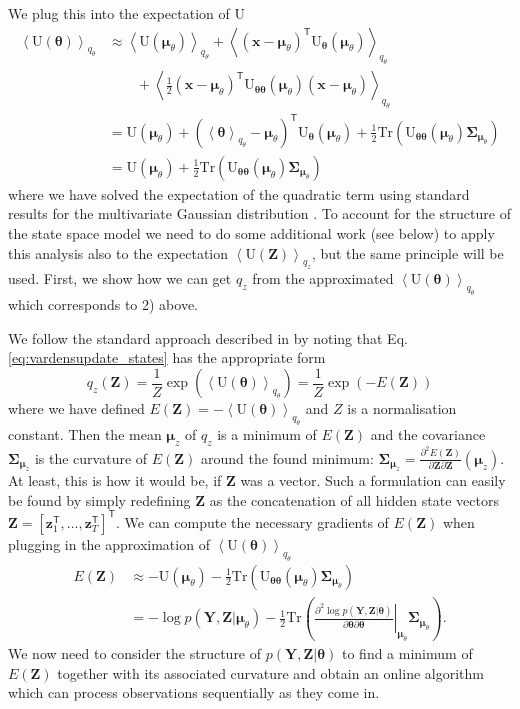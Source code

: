 \documentclass[a4paper,10pt]{article}
\newcommand{\bs}[1]{\mathbf{#1}}					%
\newcommand{\bgs}[1]{\boldsymbol{#1}}				%
\newcommand{\ppd}[3]{\frac{\partial^2 #1}{\partial #2 \partial #3}} %
\newcommand{\tr}{\mathsf{T}}				%
\newcommand{\eq}[1]{\begin{equation} #1 \end{equation}}%
\newcommand{\trace}[1]{\mathrm{Tr}\left(#1\right)}					%
\renewcommand{\ss}{z}         %
\newcommand{\sh}{x}         %
\newcommand{\spm}{\mu}    %
\renewcommand{\sp}{\theta}    %
\newcommand{\ps}{\bs{\ss}}    %
\newcommand{\ph}{\bs{\sh}}    %
\newcommand{\ppm}{\bgs{\spm}}   %
\newcommand{\pp}{\bgs{\sp}} %
\newcommand{\Ps}{\bs{Z}}    %
\newcommand{\Po}{\bs{Y}}    %
\newcommand{\E}[2][]{\left\langle #2 \right\rangle_{#1}}	%
\newcommand{\U}{\mathrm{U}}			%
\newcommand{\Cov}{\bgs{\Sigma}}			%
\begin{document}
We plug this into the expectation of $\U$
\begin{align}
    \E[q_\sp]{\U(\pp)} &\approx 
            \E[q_\sp]{\U(\ppm_\sp)} + \E[q_\sp]{(\ph - \ppm_\sp)^\tr \U_{\pp}(\ppm_\sp)}\nonumber\\
               & \qquad + \E[q_\sp]{\frac{1}{2}(\ph - \ppm_\sp)^\tr \U_{\pp\pp}(\ppm_\sp) (\ph - \ppm_\sp)}\\
        &= \U(\ppm_\sp) + \left(\E[q_\sp]{\pp} - \ppm_\sp\right)^\tr \U_{\pp}(\ppm_\sp) + \frac{1}{2}\trace{\U_{\pp\pp}(\ppm_\sp)\Cov_{\ppm_\sp}}\\
        &= \U(\ppm_\sp) + \frac{1}{2}\trace{\U_{\pp\pp}(\ppm_\sp)\Cov_{\ppm_\sp}}
\end{align}
where we have solved the expectation of the quadratic term using standard results for the multivariate Gaussian distribution \citep[][eq. (357)]{Petersen2008}. To account for the structure of the state space model we need to do some additional work (see below) to apply this analysis also to the expectation $\E[q_\ss]{\U(\Ps)}$, but the same principle will be used. First, we show how we can get $q_\ss$ from the approximated $\E[q_\sp]{\U(\pp)}$ which corresponds to 2) above.

We follow the standard approach described in \cite[p. 255]{Murphy2012} by noting that Eq. \ref{eq:vardensupdate_states} has the appropriate form
\eq{
    q_{\ss}(\Ps) = \frac{1}{Z}\exp\left(\E[q_\sp]{\U(\pp)}\right) = \frac{1}{Z}\exp\left(-E(\Ps)\right)
}
where we have defined $E(\Ps) = -\E[q_\sp]{\U(\pp)}$ and $Z$ is a normalisation constant. Then the mean $\ppm_\ss$ of $q_\ss$ is a minimum of $E(\Ps)$ and the covariance $\Cov_{\ppm_\ss}$ is the curvature of $E(\Ps)$ around the found minimum: $\Cov_{\ppm_\ss} = \ppd{E(\Ps)}{\Ps}{\Ps}(\ppm_\ss)$. At least, this is how it would be, if $\Ps$ was a vector. Such a formulation can easily be found by simply redefining $\Ps$ as the concatenation of all hidden state vectors $\Ps = [\ps_1^\tr, \dots, \ps_T^\tr]^\tr$. We can compute the necessary gradients of $E(\Ps)$ when plugging in the approximation of $\E[q_\sp]{\U(\pp)}$
\begin{align}
    E(\Ps) &\approx - \U(\ppm_\sp) - \frac{1}{2}\trace{\U_{\pp\pp}(\ppm_\sp)\Cov_{\ppm_\sp}}\\
    &= - \log p(\Po,\Ps|\ppm_\sp) - \frac{1}{2}\trace{\left.\ppd{\log p(\Po,\Ps|\pp)}{\pp}{\pp}\right|_{\ppm_\sp}\Cov_{\ppm_\sp}}.
\end{align}
We now need to consider the structure of $p(\Po,\Ps|\pp)$ to find a minimum of $E(\Ps)$ together with its associated curvature and obtain an online algorithm which can process observations sequentially as they come in.
\end{document}
